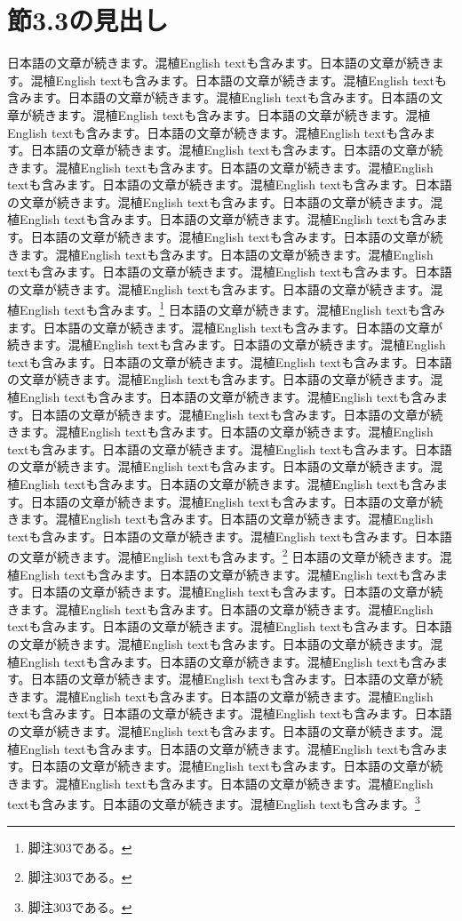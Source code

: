 \documentclass[pdflatex,book]{jlreq}
\begin{document}
\section{節3.3の見出し}
日本語の文章が続きます。混植English textも含みます。日本語の文章が続きます。混植English textも含みます。日本語の文章が続きます。混植English textも含みます。日本語の文章が続きます。混植English textも含みます。日本語の文章が続きます。混植English textも含みます。日本語の文章が続きます。混植English textも含みます。日本語の文章が続きます。混植English textも含みます。日本語の文章が続きます。混植English textも含みます。日本語の文章が続きます。混植English textも含みます。日本語の文章が続きます。混植English textも含みます。日本語の文章が続きます。混植English textも含みます。日本語の文章が続きます。混植English textも含みます。日本語の文章が続きます。混植English textも含みます。日本語の文章が続きます。混植English textも含みます。日本語の文章が続きます。混植English textも含みます。日本語の文章が続きます。混植English textも含みます。日本語の文章が続きます。混植English textも含みます。日本語の文章が続きます。混植English textも含みます。日本語の文章が続きます。混植English textも含みます。日本語の文章が続きます。混植English textも含みます。\footnote{脚注303である。}
日本語の文章が続きます。混植English textも含みます。日本語の文章が続きます。混植English textも含みます。日本語の文章が続きます。混植English textも含みます。日本語の文章が続きます。混植English textも含みます。日本語の文章が続きます。混植English textも含みます。日本語の文章が続きます。混植English textも含みます。日本語の文章が続きます。混植English textも含みます。日本語の文章が続きます。混植English textも含みます。日本語の文章が続きます。混植English textも含みます。日本語の文章が続きます。混植English textも含みます。日本語の文章が続きます。混植English textも含みます。日本語の文章が続きます。混植English textも含みます。日本語の文章が続きます。混植English textも含みます。日本語の文章が続きます。混植English textも含みます。日本語の文章が続きます。混植English textも含みます。日本語の文章が続きます。混植English textも含みます。日本語の文章が続きます。混植English textも含みます。日本語の文章が続きます。混植English textも含みます。日本語の文章が続きます。混植English textも含みます。日本語の文章が続きます。混植English textも含みます。\footnote{脚注303である。}
日本語の文章が続きます。混植English textも含みます。日本語の文章が続きます。混植English textも含みます。日本語の文章が続きます。混植English textも含みます。日本語の文章が続きます。混植English textも含みます。日本語の文章が続きます。混植English textも含みます。日本語の文章が続きます。混植English textも含みます。日本語の文章が続きます。混植English textも含みます。日本語の文章が続きます。混植English textも含みます。日本語の文章が続きます。混植English textも含みます。日本語の文章が続きます。混植English textも含みます。日本語の文章が続きます。混植English textも含みます。日本語の文章が続きます。混植English textも含みます。日本語の文章が続きます。混植English textも含みます。日本語の文章が続きます。混植English textも含みます。日本語の文章が続きます。混植English textも含みます。日本語の文章が続きます。混植English textも含みます。日本語の文章が続きます。混植English textも含みます。日本語の文章が続きます。混植English textも含みます。日本語の文章が続きます。混植English textも含みます。日本語の文章が続きます。混植English textも含みます。\footnote{脚注303である。}
\end{document}
